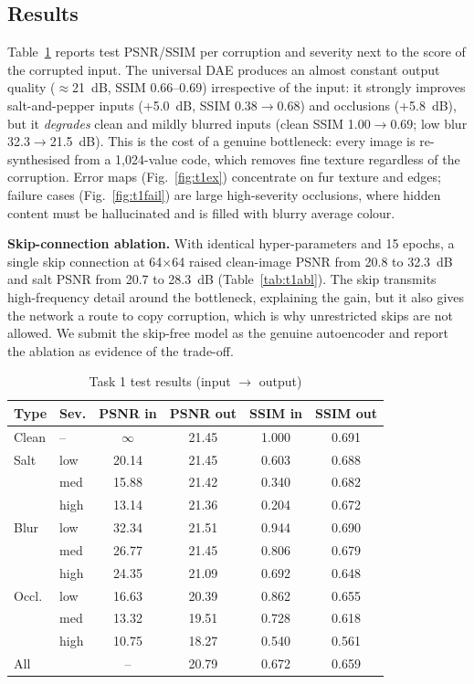 \documentclass[conference]{IEEEtran}
\begin{document}
\subsection{Results}
Table~\ref{tab:t1} reports test PSNR/SSIM per corruption and severity next to the score of the corrupted input. The universal DAE produces an almost constant output quality ($\approx$21~dB, SSIM 0.66--0.69) irrespective of the input: it strongly improves salt-and-pepper inputs (+5.0~dB, SSIM 0.38$\rightarrow$0.68) and occlusions (+5.8~dB), but it \emph{degrades} clean and mildly blurred inputs (clean SSIM 1.00$\rightarrow$0.69; low blur 32.3$\rightarrow$21.5~dB). This is the cost of a genuine bottleneck: every image is re-synthesised from a 1{,}024-value code, which removes fine texture regardless of the corruption. Error maps (Fig.~\ref{fig:t1ex}) concentrate on fur texture and edges; failure cases (Fig.~\ref{fig:t1fail}) are large high-severity occlusions, where hidden content must be hallucinated and is filled with blurry average colour.

\textbf{Skip-connection ablation.} With identical hyper-parameters and 15 epochs, a single skip connection at 64$\times$64 raised clean-image PSNR from 20.8 to 32.3~dB and salt PSNR from 20.7 to 28.3~dB (Table~\ref{tab:t1abl}). The skip transmits high-frequency detail around the bottleneck, explaining the gain, but it also gives the network a route to copy corruption, which is why unrestricted skips are not allowed. We submit the skip-free model as the genuine autoencoder and report the ablation as evidence of the trade-off.

\begin{table}[t]\caption{Task 1 test results (input $\rightarrow$ output)}\label{tab:t1}\centering\footnotesize
\begin{tabular}{@{}llcccc@{}}\toprule
Type & Sev. & PSNR in & PSNR out & SSIM in & SSIM out\\\midrule
Clean & -- & $\infty$ & 21.45 & 1.000 & 0.691\\
Salt & low & 20.14 & 21.45 & 0.603 & 0.688\\
 & med & 15.88 & 21.42 & 0.340 & 0.682\\
 & high & 13.14 & 21.36 & 0.204 & 0.672\\
Blur & low & 32.34 & 21.51 & 0.944 & 0.690\\
 & med & 26.77 & 21.45 & 0.806 & 0.679\\
 & high & 24.35 & 21.09 & 0.692 & 0.648\\
Occl. & low & 16.63 & 20.39 & 0.862 & 0.655\\
 & med & 13.32 & 19.51 & 0.728 & 0.618\\
 & high & 10.75 & 18.27 & 0.540 & 0.561\\\midrule
All & & -- & 20.79 & 0.672 & 0.659\\\bottomrule\end{tabular}\end{table}
\end{document}
